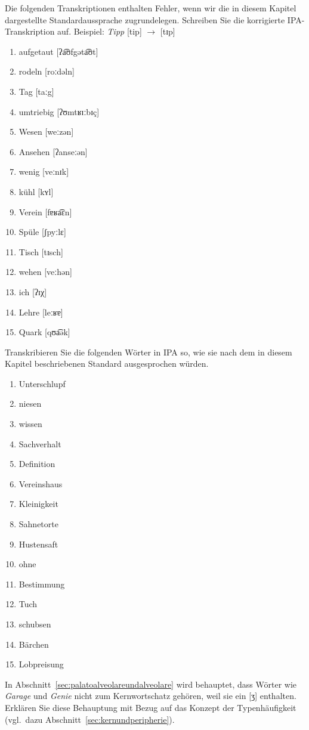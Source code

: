 \Stretch

 \label{exc:phonetik02} Die folgenden Transkriptionen enthalten Fehler, wenn wir die in diesem Kapitel dargestellte Standardaussprache zugrundelegen.
Schreiben Sie die korrigierte IPA-Transkription auf. Beispiel: \textit{Tipp} [tip] $\rightarrow$ [tɪp]

\begin{enumerate}
  \item aufgetaut [ʔa͡ʊfgəta͡ʊt]
  \item rodeln [roːdəln]
  \item Tag [taːg]
  \item umtriebig [ʔʊmtʁɪːbɪç]
  \item Wesen [weːzən]
  \item Ansehen [ʔanseːən]
  \item wenig [veːnɪk]
  \item kühl [kʏl]
  \item Verein [fɐʁa͡ɛn]
  \item Spüle [ʃpyːlɛ]
  \item Tisch [tɪsch]
  \item wehen [veːhən]
  \item ich [ʔɪχ]
  \item Lehre [leːʁɐ]
  \item Quark [qʊa͡ək]
\end{enumerate}

\Np

 \label{exc:phonetik03} Transkribieren Sie die folgenden Wörter in IPA so, wie sie nach dem in diesem Kapitel beschriebenen Standard ausgesprochen würden.

\begin{enumerate}
  \item Unterschlupf
  \item niesen
  \item wissen
  \item Sachverhalt
  \item Definition
  \item Vereinshaus
  \item Kleinigkeit
  \item Sahnetorte
  \item Hustensaft
  \item ohne
  \item Bestimmung
  \item Tuch
  \item schubsen
  \item Bärchen
  \item Lobpreisung
\end{enumerate}

\Uebung[\tristar]{} \label{exc:phonetik04} In Abschnitt~\ref{sec:palatoalveolareundalveolare} wird behauptet, dass Wörter wie \textit{Garage} und \textit{Genie} nicht zum Kernwortschatz gehören, weil sie ein [ʒ] enthalten.
Erklären Sie diese Behauptung mit Bezug auf das Konzept der Typenhäufigkeit (vgl.\ dazu Abschnitt~\ref{sec:kernundperipherie}).

